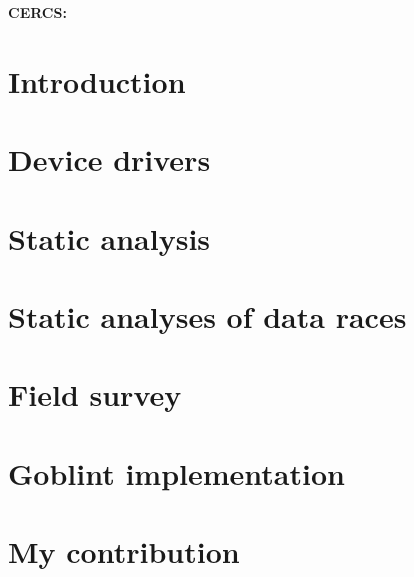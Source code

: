 \documentclass{style/master-thesis}
\begin{document}
\noindent\textbf{CERCS:}





\newpage
\tableofcontents



\section{Introduction}


\pagebreak

\section{Device drivers}


\pagebreak


\section{Static analysis} 


\pagebreak

\section{Static analyses of data races}



\section{Field survey}


\pagebreak

\section{Goblint implementation}


\pagebreak


\section{My contribution}


\pagebreak
\end{document}

